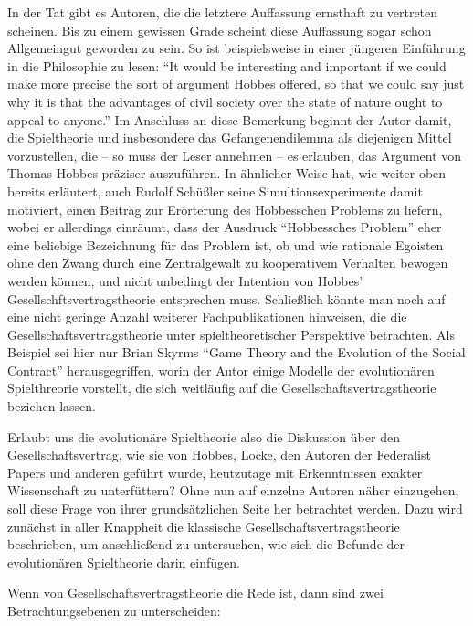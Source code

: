 \documentclass[12pt,a4paper,ngerman]{article}
\begin{document}
In der Tat gibt es Autoren, die die letztere Auffassung ernsthaft zu vertreten
scheinen. Bis zu einem gewissen Grade scheint diese Auffassung sogar schon
Allgemeingut geworden zu sein. So ist beispielsweise in einer jüngeren
Einführung in die Philosophie zu lesen: "`It would be interesting and
important if we could make more precise the sort of argument Hobbes offered,
so that we could say just why it is that the advantages of civil society over
the state of nature ought to appeal to anyone."' \cite[S. 232]{appiah:2003}
Im Anschluss an diese Bemerkung beginnt der Autor damit, die Spieltheorie und
insbesondere das Gefangenendilemma als diejenigen Mittel vorzustellen, die --
so muss der Leser annehmen -- es erlauben, das Argument von Thomas Hobbes
präziser auszuführen. In ähnlicher Weise hat, wie weiter oben bereits
erläutert, auch Rudolf Schüßler seine Simultionsexperimente damit motiviert,
einen Beitrag zur Erörterung des Hobbesschen Problems zu liefern, wobei er
allerdings einräumt, dass der Ausdruck "`Hobbessches Problem"' eher eine
beliebige Bezeichnung für das Problem ist, ob und wie rationale Egoisten ohne
den Zwang durch eine Zentralgewalt zu kooperativem Verhalten bewogen werden
können, und nicht unbedingt der Intention von Hobbes'
Gesellschftsvertragstheorie entsprechen muss. Schließlich könnte man noch auf
eine nicht geringe Anzahl weiterer Fachpublikationen hinweisen, die die
Gesellschaftsvertragstheorie unter spieltheoretischer Perspektive betrachten.
Als Beispiel sei hier nur Brian Skyrms "`Game Theory and the Evolution of the
Social Contract"' herausgegriffen, worin der Autor einige Modelle der
evolutionären Spielthreorie vorstellt, die sich weitläufig auf die
Gesellschaftsvertragstheorie beziehen lassen.

Erlaubt uns die evolutionäre Spieltheorie also die Diskussion über
den Gesellschaftsvertrag, wie sie von Hobbes, Locke, den Autoren der Federalist
Papers und anderen geführt wurde, heutzutage mit Erkenntnissen exakter
Wissenschaft zu unterfüttern? Ohne nun auf einzelne Autoren näher einzugehen,
soll diese Frage von ihrer grundsätzlichen Seite her betrachtet werden. Dazu
wird zunächst in aller Knappheit die klassische Gesellschaftsvertragstheorie
beschrieben, um anschließend zu untersuchen, wie sich die Befunde der
evolutionären Spieltheorie darin einfügen.

Wenn von Gesellschaftsvertragstheorie die Rede ist, dann sind zwei
Betrachtungsebenen zu unterscheiden:
\end{document}
